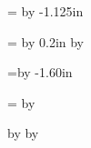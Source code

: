 \newdimen \tempp
\tempp = \hcorner 
\advance\tempp by -1.125in
\setlength{\oddsidemargin}{\tempp} %
\setlength{\evensidemargin}{\oddsidemargin}

\tempp = \hlabel  \advance \tempp by 0.2in
\multiply \tempp by \ncols 
\setlength{\textwidth}{\tempp}

\tempp=\vcorner \advance \tempp by -1.60in
\setlength{\topmargin}{\tempp}%

\tempp = \vlabel \multiply\tempp by \nrows 

\setlength{\textheight}{\tempp}
\setlength{\headheight}{-.6in}
\setlength{\footheight}{0in}
\setlength{\baselineskip}{0in}
\setlength{\fboxsep}{0in}	%
\setlength{\parskip}{0in}
\setlength{\headsep}{0in}

\advance \vlabel by \vfudge
\advance \hlabel by \hfudge

\newcommand{\lb}[1]{
\fill 0.1in
\mbox{		\rule[-\vlabel]{0in}{\vlabel} %
		\begin{minipage}[t]{\hlabel}
			\begin{flushleft}
			{\sf #1}
			\end{flushleft}
		\end{minipage}
	}
}




\raggedbottom
\raggedright



